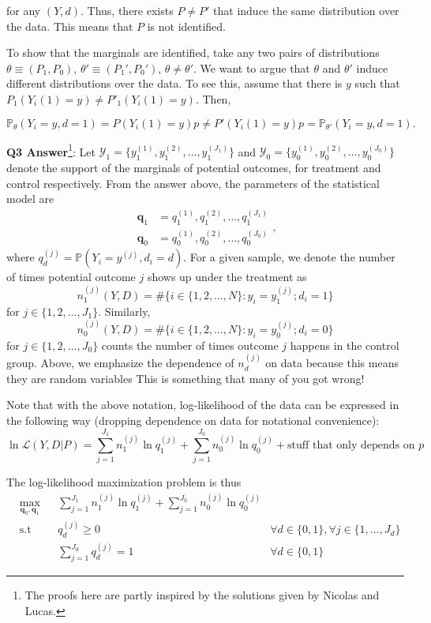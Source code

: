 \documentclass[11pt]{article} %
\begin{document}
\noindent for any $(Y,d)$. Thus, there exists $P \neq P'$ that induce the same distribution over the data. This means that $P$ is not identified. 

To show that the marginals are identified, take any two pairs of distributions $\theta \equiv (P_1,P_0)$, $\theta' \equiv (P_1',P_0')$, $\theta \neq \theta'$. We want to argue that $\theta$ and $\theta'$ induce different distributions over the data. To see this, assume that there is $y$ such that $P_1(Y_i(1) = y ) \neq P'_1(Y_i(1) = y ) $. Then, 

\[  \mathbb{P}_{\theta} (Y_i = y, d = 1 ) = P(Y_i(1)=y) p  \neq  P'(Y_i(1)=y)  p = \mathbb{P}_{\theta'} (Y_i = y, d = 1 ).   \]


\noindent \textbf{Q3 Answer}\footnote{The proofs here are partly inspired by the
  solutions given by Nicolas and Lucas.}:  Let $\mathcal{Y}_1 = \{ y_1^{(1)}, y_1^{(2)}, \ldots, y_1^{(J_1)} \}$ and
$\mathcal {Y}_0 = \{ y_0^{(1)}, y_0^{(2)}, \ldots, y_0^{(J_0)} \}$ denote the
support of the marginals of potential outcomes, for treatment and control respectively.
From the answer above, the parameters of the statistical model are
\[
  \begin{aligned}
    \mathbf q_1 &= q_1^{(1)}, q_1^{(2)}, \ldots, q_1^{(J_1)} \\
    \mathbf q_0 &= q_0^{(1)}, q_0^{(2)}, \ldots, q_0^{(J_0)}
  \end{aligned}
,\]
where $q_d^{(j)} = \mathbb P(Y_i = y^{(j)}, d_i=d)$. For a given sample, we denote
the number of times potential outcome $j$ shows up under the 
treatment as 
\[ n_1^{(j)}(Y,D) = \#\{i \in \{1,2,\ldots, N\} : y_i = y_1^{(j)} ; d_i = 1\}\]
for $j \in \{1,2,\ldots, J_1\}$. Similarly,
\[ n_0^{(j)}(Y,D) = \#\{i \in \{1,2,\ldots, N\} : y_i = y_0^{(j)} ; d_i = 0\}\]
for $j \in \{1,2,\ldots, J_0\}$ counts the number of times outcome $j$ happens
in the control group. Above, we emphasize the dependence of $n_d^{(j)}$ on
data because this means they are random variables  This is something that many
of you got wrong!  


Note that with the above notation, log-likelihood of the data can be
expressed in the following way (dropping dependence on data for notational convenience): 
\[ \ln \mathcal L(Y,D|P) = \sum_{j=1}^{J_1} n_1^{(j)} \ln q_1^{(j)} + \sum_{j=1}^{J_0} n_0^{(j)} \ln
  q_0^{(j)} + \text{stuff that only depends on }p\]

The log-likelihood maximization problem is thus
\[
  \begin{aligned}
    & \max_{\mathbf q_0, \mathbf q_1} && \sum_{j=1}^{J_1} n_1^{(j)} \ln q_1^{(j)} + \sum_{j=1}^{J_0} n_0^{(j)} \ln
    q_0^{(j)} &  \\
    & \text{s.t} && q_d^{(j)} \geq 0 & \forall d\in\{0,1\}, \forall j\in\{1,\ldots,
    J_d\} \\
    & && \sum_{j=1}^{J_d} q_d^{(j)} = 1 & \forall d\in\{0,1\}
  \end{aligned}
\]
\end{document}
